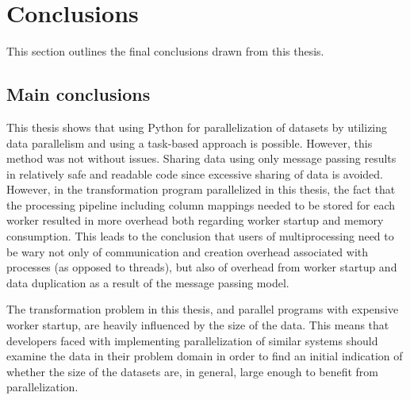 

\section{Conclusions}
This section outlines the final conclusions drawn from this thesis.

\subsection{Main conclusions}
This thesis shows that using Python  for parallelization of datasets by utilizing data parallelism
and using a task-based approach is possible. However, this method was not without issues.
Sharing data using only message passing results in relatively safe and readable code since excessive sharing of data is avoided.
However, in the transformation program parallelized in this thesis, the fact that the processing pipeline including column mappings
needed to be stored for each worker resulted in more overhead both regarding worker startup and memory consumption. This
leads to the conclusion that users of multiprocessing need to be wary not only of communication and creation overhead associated
with processes (as opposed to threads), but also of overhead from worker startup and data duplication as a result of the message
passing model.

The transformation problem in this thesis, and parallel programs with expensive worker startup, are heavily influenced by the size
of the data. This means that developers faced with implementing parallelization of similar systems should examine the data in their
problem domain in order to find an initial indication of whether the size of the datasets are, in general, large enough to benefit
from parallelization.

